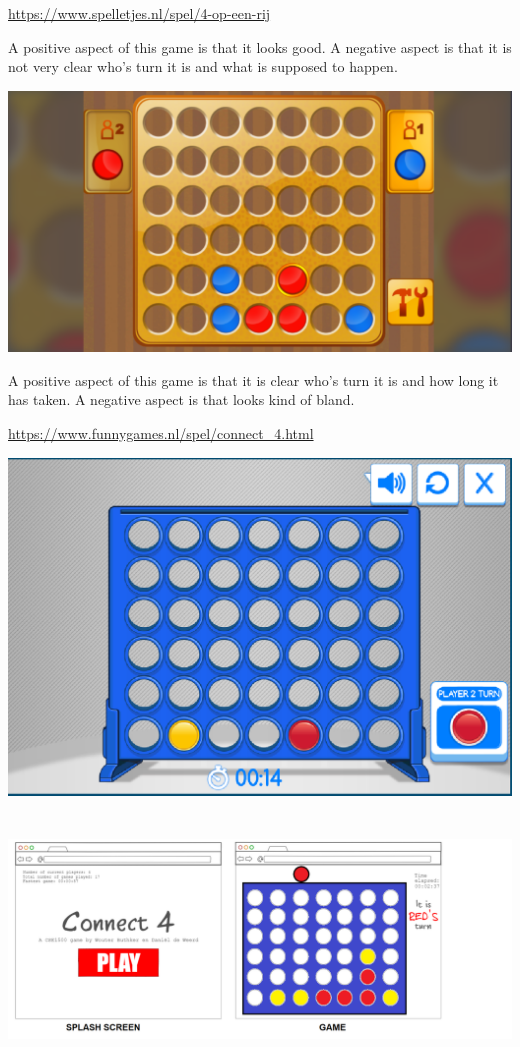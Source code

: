 \documentclass{article}
\begin{document}
     \url{https://www.spelletjes.nl/spel/4-op-een-rij}

    A positive aspect of this game is that it looks good. A negative aspect is that it is not very clear who's turn it is and what is supposed to happen.

     \includegraphics[width=\linewidth]{1}


     A positive aspect of this game is that it is clear who's turn it is and how long it has taken. A negative aspect is that looks kind of bland.

     \url{https://www.funnygames.nl/spel/connect_4.html}

     \includegraphics[width=\linewidth]{2}

    
    \section{}
    \subsection{}
    \includegraphics[width=\linewidth]{screens}
    
\end{document}
